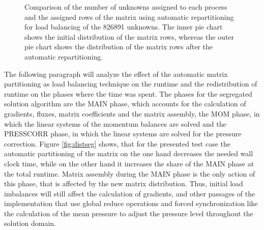 \begin{figure}[h!]
\begin{minipage}{0.45\textwidth}
\end{minipage}
\caption{Comparison of the number of unknowns assigned to each process and the assigned rows of the matrix using automatic repartitioning for load balancing of the 826891 unknowns. The inner pie chart shows the initial distribution of the matrix rows, whereas the outer pie chart shows the distribution of the matrix rows after the automatic repartitioning.}
\label{fig:distcpld}
\end{figure}

The following paragraph will analyze the effect of the automatic matrix partitioning as load balancing technique on the runtime and the redistribution of runtime on the phases where the time was spent. The phases for the segregated solution algorithm are the MAIN phase, which accounts for the calculation of gradients, fluxes, matrix coefficients and the matrix assembly, the MOM phase, in which the linear systems of the momentum balances are solved and the PRESSCORR phase, in which the linear systems are solved for the pressure correction. Figure \ref{fig:distseg} shows, that for the presented test case the automatic partitioning of the matrix on the one hand decreases the needed wall clock time, while on the other hand it increases the share of the MAIN phase at the total runtime. Matrix assembly during the MAIN phase is the only action of this phase, that is affected by the new matrix distribution. Thus, initial load imbalances will still affect the calculation of gradients, and other passages of the implementation that use global reduce operations and forced synchronization like the calculation of the mean pressure to adjust the pressure level throughout the solution domain.

